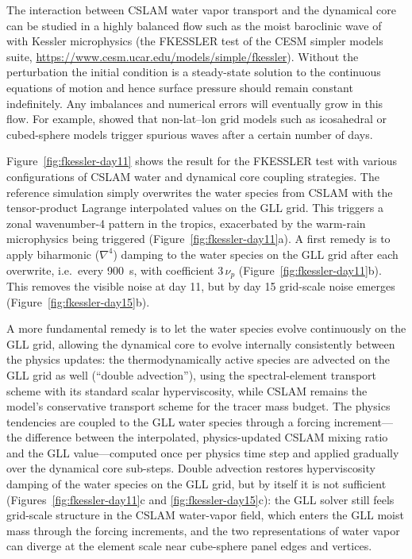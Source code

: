 \documentclass[draft]{agujournal2019}
\begin{document}
The interaction between CSLAM water vapor transport and the dynamical core
can be studied in a highly balanced flow such as the moist baroclinic wave of
 with Kessler microphysics (the FKESSLER test of the
CESM simpler models suite,
\url{https://www.cesm.ucar.edu/models/simple/fkessler}). Without the
perturbation the initial condition is a steady-state solution to the
continuous equations of motion and hence surface pressure should remain
constant indefinitely. Any imbalances and numerical errors will eventually
grow in this flow. For example,  showed that non-lat--lon
grid models such as icosahedral or cubed-sphere models trigger spurious waves
after a certain number of days.

Figure~\ref{fig:fkessler-day11} shows the result for the FKESSLER test with
various configurations of CSLAM water and dynamical core coupling strategies.
The reference simulation simply overwrites the water species from CSLAM with
the tensor-product Lagrange interpolated values on the GLL grid. This
triggers a zonal wavenumber-4 pattern in the tropics, exacerbated by the
warm-rain microphysics being triggered
(Figure~\ref{fig:fkessler-day11}a). A first remedy is to apply biharmonic
($\nabla^4$) damping to the water species on the GLL grid after each
overwrite, i.e.\ every 900~s, with coefficient $3\,\nu_p$
(Figure~\ref{fig:fkessler-day11}b). This removes the visible noise at day 11,
but by day 15 grid-scale noise emerges (Figure~\ref{fig:fkessler-day15}b).

A more fundamental remedy is to let the water species evolve continuously on
the GLL grid, allowing the dynamical core to evolve internally consistently
between the physics updates: the thermodynamically active species are
advected on the GLL grid as well (``double advection''), using the
spectral-element transport scheme with its standard scalar hyperviscosity,
while CSLAM remains the model's conservative transport scheme for the tracer
mass budget. The physics tendencies are coupled to the GLL water species
through a forcing increment---the difference between the interpolated,
physics-updated CSLAM mixing ratio and the GLL value---computed once per
physics time step and applied gradually over the dynamical core sub-steps.
Double advection restores hyperviscosity damping of the water species on the
GLL grid, but by itself it is not sufficient
(Figures~\ref{fig:fkessler-day11}c and \ref{fig:fkessler-day15}c): the GLL
solver still feels grid-scale structure in the CSLAM water-vapor field, which
enters the GLL moist mass through the forcing increments, and the two
representations of water vapor can diverge at the element scale near
cube-sphere panel edges and vertices.
\end{document}
